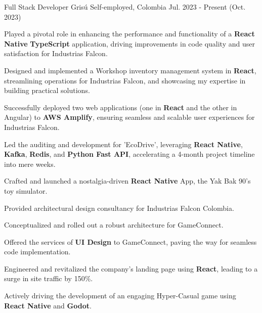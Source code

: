 \newcommand{\quotes}[1]{``#1''}

\begin{cventries}

  \cventry
  {Full Stack Developer} %
  {Grisú} %
  {Self-employed, Colombia} %
  {Jul. 2023 - Present (Oct. 2023)} %
  {
    \begin{cvitems} %
      \item {Played a pivotal role in enhancing the performance and functionality of a \textbf{React Native} \textbf{TypeScript} application, driving improvements in code quality and user satisfaction for Industrias Falcon.}
      \item {Designed and implemented a Workshop inventory management system in \textbf{React}, streamlining operations for Industrias Falcon, and showcasing my expertise in building practical solutions.}
      \item {Successfully deployed two web applications (one in \textbf{React} and the other in Angular) to \textbf{AWS Amplify}, ensuring seamless and scalable user experiences for Industrias Falcon.}
      \item {Led the auditing and development for 'EcoDrive', leveraging \textbf{React Native}, \textbf{Kafka}, \textbf{Redis}, and \textbf{Python Fast API}, accelerating a 4-month project timeline into mere weeks.}
      \item {Crafted and launched a nostalgia-driven \textbf{React Native} App, the Yak Bak 90's toy simulator.}
      \item {Provided architectural design consultancy for Industrias Falcon Colombia.}
      \item {Conceptualized and rolled out a robust architecture for GameConnect.}
      \item {Offered the services of \textbf{UI Design} to GameConnect, paving the way for seamless code implementation.}
      \item {Engineered and revitalized the company's landing page using \textbf{React}, leading to a surge in site traffic by 150\%.}
      \item {Actively driving the development of an engaging Hyper-Casual game using \textbf{React Native} and \textbf{Godot}.}
    \end{cvitems}
  }


\end{cventries}
